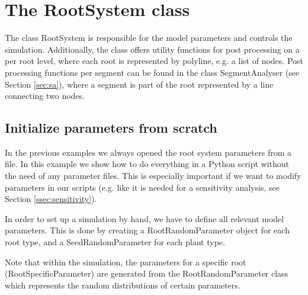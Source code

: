 \section{The RootSystem class} \label{sec:rs}

The class RootSystem is responsible for the model parameters and controls the simulation. Additionally, the class offers utility functions for post processing on a per root level, where each root is represented by polyline, e.g. a list of nodes. Post processing functions per segment can be found in the class SegmentAnalyser (see Section \ref{sec:sa}), where a segment is part of the root represented by a line connecting two nodes.

\subsection{Initialize parameters from scratch} \label{sec:from_scratch}
 
In the previous examples we always opened the root system parameters from a file. In this example we show how to do everything in a Python script without the need of any parameter files. This is especially important if we want to modify parameters in our scripts (e.g. like it is needed for a sensitivity analysis, see Section \ref{ssec:sensitivity}).

In order to set up a simulation by hand, we have to define all relevant model parameters. This is done by creating a RootRandomParameter object for each root type, and a SeedRandomParameter for each plant type. 

Note that within the simulation, the parameters for a specific root (RootSpecificParameter) are generated from the RootRandomParameter class which represents the random distributions of certain parameters.



